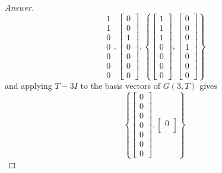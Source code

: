 \documentclass{article}
\newcommand{\bracks}[1]{\left\{#1\right\}}
\newcommand{\sqbracks}[1]{\left[#1\right]}
\begin{document}
\begin{proof}[Answer]
$${{\begin{matrix}
            1 \\
            1 \\
            0 \\
            0 \\
            0 \\
            0 \\
            0 
            \end{matrix}}, \sqbracks{\begin{matrix}
            0 \\
            0 \\
            1 \\
            0 \\
            0 \\
            0 \\
            0 
            \end{matrix}}}, 
            \bracks{\sqbracks{\begin{matrix}
            1 \\
            1 \\
            1 \\
            0 \\
            0 \\
            0 \\
            0 
            \end{matrix}}, \sqbracks{\begin{matrix}
            0 \\
            0 \\
            0 \\
            1 \\
            0 \\
            0 \\
            0 
            \end{matrix}}}$$
            and applying $T - 3I$ to the basis vectors of $G(3,T)$ gives
            $$\bracks{\sqbracks{\begin{matrix}
            0 \\
            0 \\
            0 \\
            0 \\
            0 \\
            0 \\
            0 
            \end{matrix}}, \sqbracks{\begin{matrix}
            0 \\

\end{matrix}}}$$
\end{proof}
\end{document}
